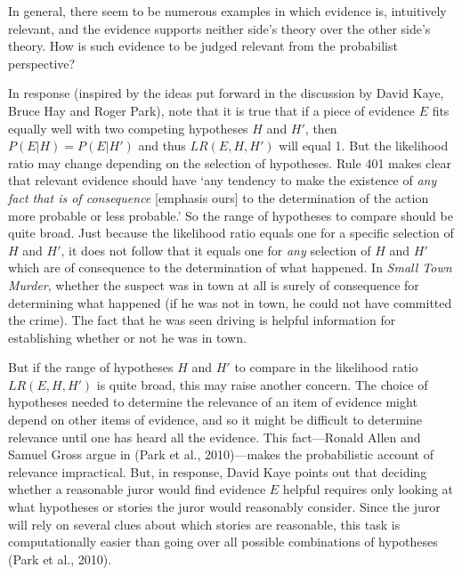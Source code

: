 \documentclass[
  10pt,
  dvipsnames,enabledeprecatedfontcommands]{scrartcl}
\begin{document}
\noindent In general, there seem to be numerous examples in which
evidence is, intuitively relevant, and the evidence supports neither
side's theory over the other side's theory. How is such evidence to be
judged relevant from the probabilist perspective?

In response (inspired by the ideas put forward in the discussion by
David Kaye, Bruce Hay and Roger Park), note that it is true that if a
piece of evidence \(E\) fits equally well with two competing hypotheses
\(H\) and \(H'\), then \(P(E\vert H)=P(E\vert H')\) and thus
\(LR(E,H,H')\) will equal 1. But the likelihood ratio may change
depending on the selection of hypotheses. Rule 401 makes clear that
relevant evidence should have `any tendency to make the existence of
\emph{any fact that is of consequence} {[}emphasis ours{]} to the
determination of the action more probable or less probable.' So the
range of hypotheses to compare should be quite broad. Just because the
likelihood ratio equals one for a specific selection of \(H\) and
\(H'\), it does not follow that it equals one for \textit{any} selection
of \(H\) and \(H'\) which are of consequence to the determination of
what happened. In \textit{Small Town Murder}, whether the suspect was in
town at all is surely of consequence for determining what happened (if
he was not in town, he could not have committed the crime). The fact
that he was seen driving is helpful information for establishing whether
or not he was in town.

But if the range of hypotheses \(H\) and \(H'\) to compare in the
likelihood ratio \(LR(E, H, H')\) is quite broad, this may raise another
concern. The choice of hypotheses needed to determine the relevance of
an item of evidence might depend on other items of evidence, and so it
might be difficult to determine relevance until one has heard all the
evidence. This fact---Ronald Allen and Samuel Gross argue in (Park et
al., 2010)---makes the probabilistic account of relevance impractical.
But, in response, David Kaye points out that deciding whether a
reasonable juror would find evidence \(E\) helpful requires only looking
at what hypotheses or stories the juror would reasonably consider. Since
the juror will rely on several clues about which stories are reasonable,
this task is computationally easier than going over all possible
combinations of hypotheses (Park et al., 2010).
\end{document}
